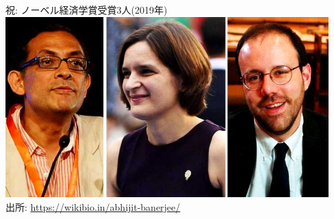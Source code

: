 \frame{\titlepage}
\setcounter{page}{1}



\begin{frame}{祝: ノーベル経済学賞受賞3人(2019年)}
\hfil\includegraphics[height = 7cm]{ImpactEvaluation/figure/BanerjeeDufloKremer.jpg}\\
{\footnotesize 出所: \url{https://wikibio.in/abhijit-banerjee/}}
\end{frame}

